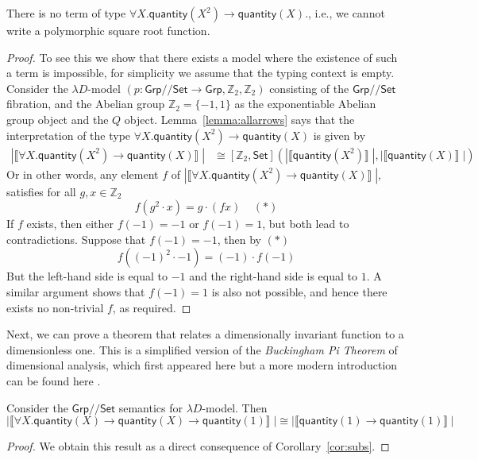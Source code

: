 \documentclass[a4paper,UKenglish]{lipics}
\newcommand{\msf}[1]{\mathsf{#1}} %
\newcommand{\Grp}{\msf{Grp}}
\newcommand{\Set}{\msf{Set}}
\newcommand{\GroupSet}[1]{[#1,\Set]}
\newcommand{\Lslice}[1]{#1/\!/\Set}
\newcommand{\GrpSet}{\Lslice{\Grp}}
\newcommand{\bbZ}{\mathbb{Z}}
\newcommand{\sem}[1]{\ensuremath{\llbracket #1 \rrbracket} \;}
\newcommand{\qnt}{\msf{quantity}}
\begin{document}
\begin{theorem}
\label{thm:UninhabType}
 There is no term of type $\forall X . \qnt(X^2) \rightarrow \qnt(X)$., i.e., we cannot write a polymorphic square root function.
\end{theorem}
\begin{proof}
To see this we show that there exists a model where the existence of such a term is impossible, for simplicity we assume that the typing context is empty. Consider the $\lambda D$-model $(p:\GrpSet \rightarrow \Grp, \mathbb{Z}_2, \mathbb{Z}_2)$  consisting of the $\GrpSet$ fibration, and the Abelian group $\mathbb{Z}_2 = \{ -1, 1\}$ as the exponentiable Abelian group object and the $Q$ object. Lemma~\ref{lemma:allarrows} says that the interpretation of the type $\forall X . \qnt(X^2) \rightarrow \qnt(X)$ is given by
\begin{align*}
  |\sem{\forall X . \qnt(X^2) \rightarrow \qnt(X)}|  &  \cong \GroupSet{\mathbb{Z}_2} (|\sem{\qnt (X^2)}|, |\sem{\qnt(X)}|)
\end{align*}
Or in other words, any element $f$ of $ |\sem{\forall X . \qnt(X^2) \rightarrow \qnt(X)}|$, satisfies for all $g, x \in \bbZ_2$
\[
f (g^2 \cdot x) = g \cdot (fx) \; \; \; \; (\ast)
\]
If $f$ exists, then either $f(-1) = -1$ or $f(-1) = 1$, but both lead to contradictions. Suppose that $f(-1) = -1$, then by $(\ast)$
\[
 f((-1)^2 \cdot -1) = (-1) \cdot f(-1)
\]
But the left-hand side is equal to $-1$ and the right-hand side is equal to $1$. A similar argument shows that $f(-1)=1$ is also not possible, and hence there exists no non-trivial $f$, as required.
\end{proof}

Next, we can prove a theorem that relates a dimensionally invariant function to a dimensionless one. This is a simplified version of the \emph{Buckingham Pi Theorem} of dimensional analysis, which first appeared here \cite{buckingham1914physically} but a more modern introduction can be found here \cite{sonin2001physical}.

\begin{theorem}
 \label{lem:AppSubs}
Consider the $\GrpSet$ semantics for $\lambda D$-model. Then
\[
 |\sem{\forall X . \qnt(X) \rightarrow \qnt(X) \rightarrow \qnt(1)}| \cong |\sem{\qnt(1)\rightarrow \qnt(1)}|
\]
\end{theorem}
\begin{proof}
We obtain this result as a direct consequence of Corollary~\ref{cor:subs}.
\end{proof}
\end{document}
